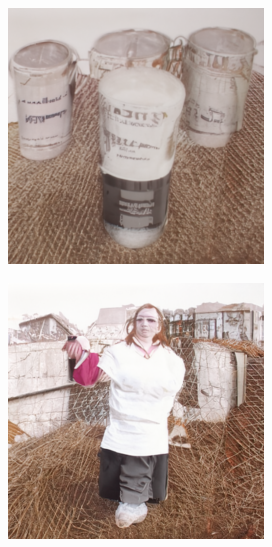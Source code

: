 \documentclass{article}
\begin{document}
\begin{figure}
\begin{subfigure}[b]{0.19\linewidth}
    \includegraphics[width=\linewidth]{figures/imagenet256/solver_samples/imagenet256_fm_ot_11_10.png}
    \end{subfigure}
    \begin{subfigure}[b]{0.19\linewidth}
    \includegraphics[width=\linewidth]{figures/imagenet256/solver_samples/imagenet256_fm_ot_11_20.png}

\end{subfigure}
\end{figure}
\end{document}
